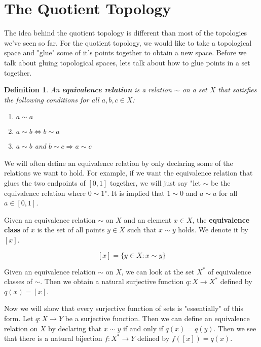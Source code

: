 \documentclass[a4paper]{article}
\newtheorem{definition}[theorem]{Definition}
\numberwithin{theorem}{section}
\begin{document}
\section{The Quotient Topology}

The idea behind the quotient topology is different than most of the topologies we've seen so far. For the quotient topology, we would like to take a topological space and "glue" some of it's points together to obtain a new space. Before we talk about gluing topological spaces, lets talk about how to glue points in a set together.

\begin{definition}
An \textbf{equivalence relation} is a relation $\sim$ on a set $X$ that satisfies the following conditions for all $a,b,c\in X$:
\begin{enumerate}
    \item $a \sim a$
    \item $a \sim b \Leftrightarrow b \sim a$
    \item $a \sim b$ and $b \sim c \Rightarrow a \sim c$
\end{enumerate}
\end{definition}

We will often define an equivalence relation by only declaring some of the relations we want to hold. For example, if we want the equivalence relation that glues the two endpoints of $[0,1]$ together, we will just say "let $\sim$ be the equivalence relation where $0 \sim 1$". It is implied that $1 \sim 0$ and $a \sim a$ for all $a \in [0,1]$.

Given an equivalence relation $\sim$ on $X$ and an element $x \in X$, the \textbf{equivalence class} of $x$ is the set of all points $y \in X$ such that $x \sim y$ holds. We denote it by $[x]$.

$$ [x] = \{y \in X : x \sim y\} $$

Given an equivalence relation $\sim$ on $X$, we can look at the set $X^*$ of equivalence classes of $\sim$. Then we obtain a natural surjective function $q: X \rightarrow X^*$ defined by $q(x) = [x]$.

Now we will show that every surjective function of sets is "essentially" of this form. Let $q: X \rightarrow Y$ be a surjective function. Then we can define an equivalence relation on $X$ by declaring that $x \sim y$ if and only if $q(x) = q(y)$. Then we see that there is a natural bijection $f: X^* \rightarrow Y$ defined by $f([x]) = q(x)$.

\begin{center}
\end{center}
\end{document}
